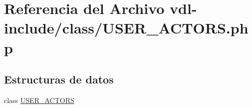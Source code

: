 \hypertarget{USER__ACTORS_8php}{\section{Referencia del Archivo vdl-\/include/class/\-U\-S\-E\-R\-\_\-\-A\-C\-T\-O\-R\-S.php}
\label{USER__ACTORS_8php}
}
\subsection*{Estructuras de datos}
\begin{DoxyCompactItemize}
\item 
class \hyperlink{classUSER__ACTORS}{U\-S\-E\-R\-\_\-\-A\-C\-T\-O\-R\-S}
\end{DoxyCompactItemize}
